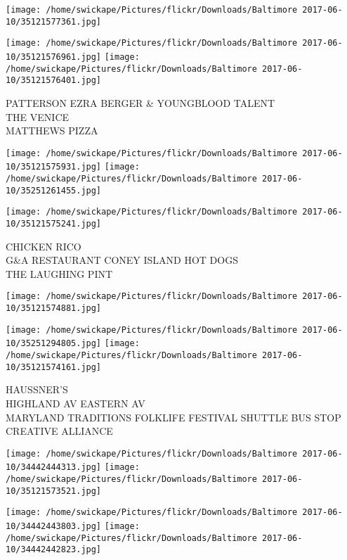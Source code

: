 \documentclass[10pt,letterpaper]{article}
\begin{document}
\texttt{[image: /home/swickape/Pictures/flickr/Downloads/Baltimore 2017-06-10/35121577361.jpg]}

\vspace{0.25in}
\texttt{[image: /home/swickape/Pictures/flickr/Downloads/Baltimore 2017-06-10/35121576961.jpg]}
\texttt{[image: /home/swickape/Pictures/flickr/Downloads/Baltimore 2017-06-10/35121576401.jpg]}

PATTERSON EZRA BERGER \& YOUNGBLOOD TALENT\\
THE VENICE\\
MATTHEWS PIZZA\\
\pagebreak

\texttt{[image: /home/swickape/Pictures/flickr/Downloads/Baltimore 2017-06-10/35121575931.jpg]}
\texttt{[image: /home/swickape/Pictures/flickr/Downloads/Baltimore 2017-06-10/35251261455.jpg]}

\texttt{[image: /home/swickape/Pictures/flickr/Downloads/Baltimore 2017-06-10/35121575241.jpg]}

CHICKEN RICO\\
G\&A RESTAURANT CONEY ISLAND HOT DOGS\\
THE LAUGHING PINT\\
\pagebreak

\texttt{[image: /home/swickape/Pictures/flickr/Downloads/Baltimore 2017-06-10/35121574881.jpg]}

\vspace{0.25in}
\texttt{[image: /home/swickape/Pictures/flickr/Downloads/Baltimore 2017-06-10/35251294805.jpg]}
\texttt{[image: /home/swickape/Pictures/flickr/Downloads/Baltimore 2017-06-10/35121574161.jpg]}

HAUSSNER'S\\
HIGHLAND AV EASTERN AV\\
MARYLAND TRADITIONS FOLKLIFE FESTIVAL SHUTTLE BUS STOP CREATIVE ALLIANCE\\
\pagebreak

\texttt{[image: /home/swickape/Pictures/flickr/Downloads/Baltimore 2017-06-10/34442444313.jpg]}
\texttt{[image: /home/swickape/Pictures/flickr/Downloads/Baltimore 2017-06-10/35121573521.jpg]}

\texttt{[image: /home/swickape/Pictures/flickr/Downloads/Baltimore 2017-06-10/34442443803.jpg]}
\texttt{[image: /home/swickape/Pictures/flickr/Downloads/Baltimore 2017-06-10/34442442823.jpg]}
\end{document}
